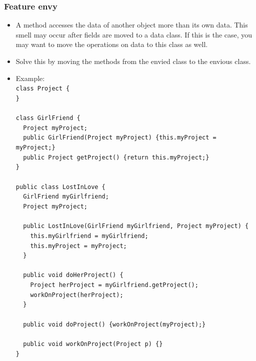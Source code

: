 \documentclass{article}
\begin{document}
\subsubsection{Feature envy}
\begin{itemize}
    \item A method accesses the data of another object more than its own data. This smell may occur after fields are moved to a data class. If this is the case, you may want to move the operations on data to this class as well.
    \item Solve this by moving the methods from the envied class to the envious class.
    \item Example:\\
        \lstinline|class Project {|\\
        \lstinline|}|\\\\
        \lstinline|class GirlFriend {|\\
        \lstinline|  Project myProject;|\\
        \lstinline|  public GirlFriend(Project myProject) {this.myProject = myProject;}|\\
        \lstinline|  public Project getProject() {return this.myProject;}|\\
        \lstinline|}|\\\\
        \lstinline|public class LostInLove {|\\
        \lstinline|  GirlFriend myGirlfriend;|\\
        \lstinline|  Project myProject;|\\\\
        \lstinline|  public LostInLove(GirlFriend myGirlfriend, Project myProject) {|\\
        \lstinline|    this.myGirlfriend = myGirlfriend;|\\
        \lstinline|    this.myProject = myProject;|\\
        \lstinline|  }|\\\\
        \lstinline|  public void doHerProject() {|\\
        \lstinline|    Project herProject = myGirlfriend.getProject();|\\
        \lstinline|    workOnProject(herProject);|\\
        \lstinline|  }|\\\\
        \lstinline|  public void doProject() {workOnProject(myProject);}|\\\\
        \lstinline|  public void workOnProject(Project p) {}|\\
        \lstinline|}|
\end{itemize}
\end{document}

